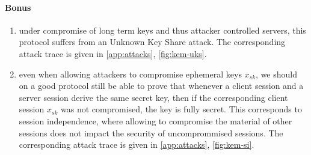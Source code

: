 \documentclass{article}
\newcommand{\sfsk}{\mathit{sk}}
\begin{document}
\paragraph{Bonus}
\begin{enumerate}
\item under compromise of long term keys and thus attacker controlled servers, this protocol suffers from an Unknown Key Share attack. The corresponding attack trace is given in \cref{app:attacks}, \cref{fig:kem-uks}.
\item  even when allowing attackers to compromise ephemeral keys $x_\sfsk$, we should on a good protocol still be able to prove that whenever a client session and a server session derive the same secret key, then if the corresponding client session $x_\sfsk$ was not compromised, the key is fully secret. This corresponds to session independence, where allowing to compromise the material of other sessions does not impact the security of uncomprommised sessions.  The corresponding attack trace is given in \cref{app:attacks}, \cref{fig:kem-si}.  
\end{enumerate}
\end{document}
